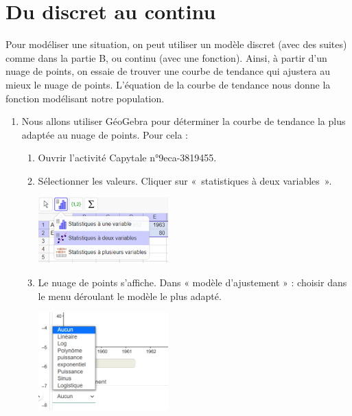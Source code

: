 \documentclass[a4paper,11pt,exos]{nsi} %
\begin{document}
\section*{Du discret au continu}
Pour modéliser une situation, on peut utiliser un modèle discret (avec des suites) comme dans la partie B, ou continu (avec une fonction). Ainsi, à partir d’un nuage de points, on essaie de trouver une courbe de tendance qui ajustera au mieux le nuage de points. L’équation de la courbe de tendance nous donne la fonction modélisant notre population.
\begin{enumerate}
    \item Nous allons utiliser GéoGebra pour déterminer la courbe de tendance la plus adaptée au nuage de points. Pour cela :
    \begin{enumerate}[label=\textbullet]
        \item Ouvrir l'activité Capytale n°9eca-3819455.
        \item Sélectionner les valeurs. Cliquer sur « statistiques à
        deux variables ».
        \begin{center}
            \includegraphics[width=5cm]{geogebra1.png}
        \end{center}
        \item Le nuage de points s'affiche. Dans « modèle d’ajustement » : choisir dans le menu déroulant le modèle le plus adapté.
        \begin{center}
            \includegraphics[width=5cm]{geogebra2.png}
        \end{center}
    \end{enumerate}


\end{enumerate}
\end{document}
